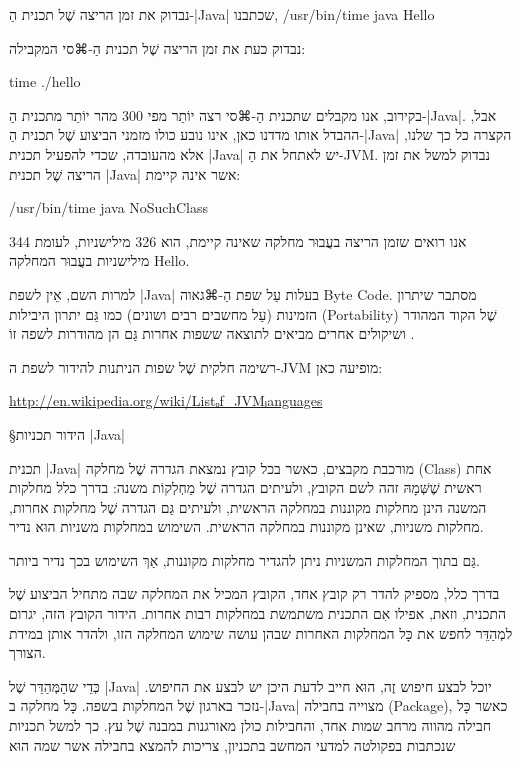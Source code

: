 נבדוק את זמן הריצה שֶׁל תכנית הַ-|Java| שכתבנו,
/usr/bin/time java Hello
\END

נבדוק כעת את זמן הריצה שֶׁל תכנית הַ-⌘סי המקבילה:

time ./hello
\END

בקירוב, אנו מקבלים שתכנית הַ-⌘סי רצה יוֹתֵר מפי 300 מהר יוֹתֵר מתכנית הַ-|Java|.
אבל, ההבדל אותו מדדנו כאן, אינו נובע כולו מזמני הביצוע שֶׁל תכנית הַ-|Java|
הקצרה כל כך שלנו, אלא מהעובדה, שכדי להפעיל תכנית \E|Java| יש לאתחל את
הַ-JVM. נבדוק למשל את זמן הריצה שֶׁל תכנית \E|Java| אשר אינה קיימת:

/usr/bin/time java NoSuchClass
\END

אנו רואים שזמן הריצה בעֲבוּר מחלקה שאינה קיימת, הוא 326 מילישניות, לעומת 344
מילישניות בעֲבוּר המחלקה Hello.

למרות השם, אֵין לשפת \E|Java| בעלות עַל שפת הַ-⌘גאוה Byte Code. מסתבר שיתרון הזמינות
(עַל מחשבים רבים ושונים) כמו גַּם יתרון היבילות (Portability) שֶׁל הקוד המהודר
ושיקולים אחרים מביאים לתוצאה ששפות אחרות גַּם הן מהודרות לשפה זוֹ .

רשימה חלקית שֶׁל שפות הניתנות להידור לשפת ה-JVM מופיעה כאן:

\begin{english}
\url{http://en.wikipedia.org/wiki/Listₒf_JVMₗanguages}
\end{english}

§הידור תכניות \E|Java|

תכנית \E|Java| מורכבת מקבצים, כאשר בכל קובץ נמצאת הגדרה שֶׁל מחלקה
(Class)
 אחת ראשית שֶׁשְּׁמָהּ זהה לשם הקובץ,
ולעיתים הגדרה שֶׁל מַחְלְקוֹת
משנה: בדרך כלל מחלקות המשנה הינן מחלקות מקוננות במחלקה הראשית, ולעיתים גַּם
הגדרה שֶׁל מחלקות אחרות, מחלקות משניות, שאינן מקוננות במחלקה הראשית. השימוש
במחלקות משניות הוּא נדיר.

גַּם בתוך המחלקות המשניות ניתן להגדיר מחלקות מקוננות, אַךְ השימוש בכך
נדיר ביותר.

בדרך כלל, מספיק להדר רק קובץ אחד, הקובץ המכיל את המחלקה שבה מתחיל
הביצוע שֶׁל התכנית, וזאת, אפילו אִם התכנית משתמשת במחלקות רבות אחרות.
הידור הקובץ הזה, יגרום למְהַדֵּר לחפש את כָּל המחלקות האחרות שבהן
עושה שימוש המחלקה הזו, ולהדר אותן במידת הצורך.

כְּדֵי שהַמְּהַדֵּר שֶׁל \E|Java| יוכל לבצע חיפוש זֶה, הוּא חייב לדעת היכן יש לבצע
את החיפוש. נזכר בארגון שֶׁל המחלקות בשפה. כָּל מחלקה ב-|Java| מצוייה
בחבילה (Package), כאשר כָּל חבילה מהווה מרחב שמות אחד, והחבילות כולן מאורגנות
במבנה שֶׁל עץ. כך למשל תכניות שנכתבות בפקולטה למדעי המחשב בתכניון,
צריכות להמצא בחבילה אשר שמה הוּא


